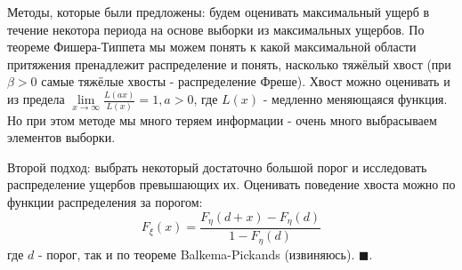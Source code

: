 \documentclass[%
12pt, %
final, %
oneside, %
onecolumn, %
centertags]{article} %
\theoremstyle{plain}
\theoremstyle{definition}
\theoremstyle{remark}
\begin{document}
\begin{enumerate}
Методы, которые были предложены: будем оценивать максимальный ущерб в течение некотора периода на основе выборки из максимальных ущербов. По теореме Фишера-Типпета мы можем понять к какой максимальной области притяжения пренадлежит распределение и понять, насколько тяжёлый хвост (при $\beta > 0$ самые тяжёлые хвосты - распределение Фреше). Хвост можно оценивать и из предела $\lim\limits_{x \to \infty} \frac{L(ax)}{L(x)} = 1, a>0$, где $L(x)$ - медленно меняющаяся функция. Но при этом методе мы много теряем информации - очень много выбрасываем элементов выборки.

Второй подход: выбрать некоторый достаточно большой порог и исследовать распределение ущербов превышающих их. Оценивать поведение хвоста можно по функции распределения за порогом:
$$F_{\xi}(x) = \frac{F_{\eta}(d + x) - F_{\eta}(d)}{1 - F_{\eta}(d)}$$
где $d$ - порог, так и по теореме Balkema-Pickands (извиняюсь). $\blacksquare$.
\end{enumerate}
\end{document}
